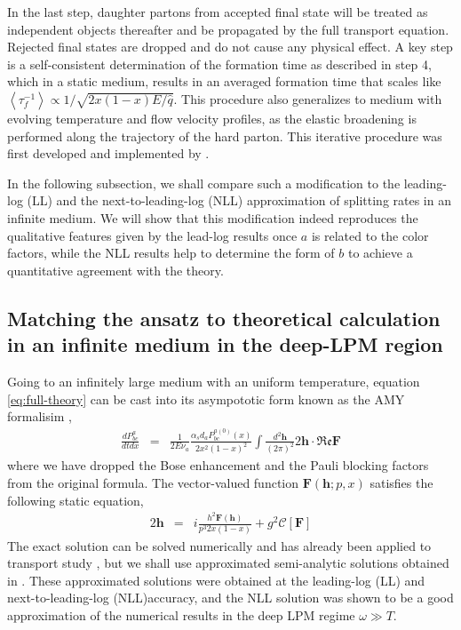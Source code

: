 \documentclass[aps, prc, reprint, amsmath, groupedaddress, nofootinbib]{revtex4-1}
\begin{document}
In the last step, daughter partons from accepted final state will be treated as independent objects thereafter and be propagated by the full transport equation.
Rejected final states are dropped and do not cause any physical effect. 
A key step is a self-consistent determination of the formation time as described in step 4, which in a static medium, results in an averaged formation time that scales like $\left\langle\tau_f^{-1}\right\rangle \propto 1/\sqrt{2x(1-x)E/\hat{q}}$.
This procedure also generalizes to medium with evolving temperature and flow velocity profiles, as the elastic broadening is performed along the trajectory of the hard parton.
This iterative procedure was first developed and implemented by \cite{Zapp:2011ya}.

In the following subsection, we shall compare such a modification to the leading-log (LL) and the next-to-leading-log (NLL) approximation of splitting rates in an infinite medium. 
We will show that this modification indeed reproduces the qualitative features given by the lead-log results once $a$ is related to the color factors, while the NLL results help to determine the form of $b$ to achieve a quantitative agreement with the theory.

\subsection{Matching the ansatz to theoretical calculation in an infinite medium in the deep-LPM region}
Going to an infinitely large medium with an uniform temperature, equation \ref{eq:full-theory} can be cast into its asympototic form known as the AMY formalisim \cite{Arnold:2002ja,Arnold:2002zm,Arnold:2003zc},
\begin{eqnarray}\label{eq:AMY-1}
\frac{dP^a_{bc}}{dt dx} &=& \frac{1}{2E\nu_a} \frac{\alpha_s d_a P^{a(0)}_{bc}(x)}{2x^2(1-x)^2}\int\frac{d^2\mathbf{h}}{(2\pi)^2}2\mathbf{h}\cdot \mathfrak{Re} \mathbf{F}
\end{eqnarray}
where we have dropped the Bose enhancement and the Pauli blocking factors from the original formula.
The vector-valued function $\mathbf{F}(\mathbf{h}; p, x)$ satisfies the following static equation,
\begin{eqnarray}\label{eq:AMY-2}
2\mathbf{h} &=& i\frac{h^2 \mathbf{F}(\mathbf{h})}{p^3 2x(1-x)} + g^2 \mathcal{C}[\mathbf{F}]
\end{eqnarray} 
The exact solution can be solved numerically and has already been applied to transport study \cite{Jeon:2003gi,Schenke:2009gb}, but we shall use approximated semi-analytic solutions obtained in \cite{Arnold:2008zu}.
These approximated solutions were obtained at the leading-log (LL) and next-to-leading-log (NLL)accuracy, and the NLL solution was shown to be a good approximation of the numerical results in the deep LPM regime $\omega \gg T$.
\end{document}
